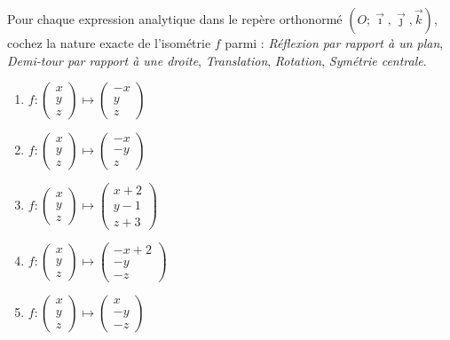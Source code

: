 \documentclass[11pt]{article}
\begin{document}
\begin{exercice}
Pour chaque expression analytique dans le repère orthonormé $(O;\vec{\imath},\vec{\jmath},\vec{k})$, cochez la nature exacte de l'isométrie $f$ parmi : \textit{Réflexion par rapport à un plan}, \textit{Demi-tour par rapport à une droite}, \textit{Translation}, \textit{Rotation}, \textit{Symétrie centrale}.
\begin{enumerate}
    \item $f : \begin{pmatrix} x \\ y \\ z \end{pmatrix} \mapsto \begin{pmatrix} -x \\ y \\ z \end{pmatrix}$
    \item $f : \begin{pmatrix} x \\ y \\ z \end{pmatrix} \mapsto \begin{pmatrix} -x \\ -y \\ z \end{pmatrix}$
    \item $f : \begin{pmatrix} x \\ y \\ z \end{pmatrix} \mapsto \begin{pmatrix} x+2 \\ y-1 \\ z+3 \end{pmatrix}$
    \item $f : \begin{pmatrix} x \\ y \\ z \end{pmatrix} \mapsto \begin{pmatrix} -x+2 \\ -y \\ -z \end{pmatrix}$
    \item $f : \begin{pmatrix} x \\ y \\ z \end{pmatrix} \mapsto \begin{pmatrix} x \\ -y \\ -z \end{pmatrix}$
\end{enumerate}
\end{exercice}
\end{document}
